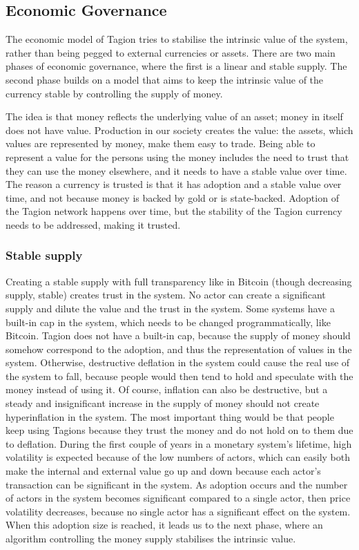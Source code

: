 \subsection{Economic Governance} \label{subsec:economic_governance}
The economic model of Tagion tries to stabilise the intrinsic value of the system, rather than being pegged to external currencies or assets. 
There are two main phases of economic governance, where the first is a linear and stable supply. The second phase builds on a model that aims to keep the intrinsic value of the currency stable by controlling the supply of money. 

The idea is that money reflects the underlying value of an asset; money in itself does not have value. Production in our society creates the value: the assets, which values are represented by money, make them easy to trade. Being able to represent a value for the persons using the money includes the need to trust that they can use the money elsewhere, and it needs to have a stable value over time. 
The reason a currency is trusted is that it has adoption and a stable value over time, and not because money is backed by gold or is state-backed. Adoption of the Tagion network happens over time, but the stability of the Tagion currency needs to be addressed, making it trusted. 


\subsubsection{Stable supply}
Creating a stable supply with full transparency like in Bitcoin (though decreasing supply, stable) creates trust in the system. No actor can create a significant supply and dilute the value and the trust in the system. 
Some systems have a built-in cap in the system, which needs to be changed programmatically, like Bitcoin. Tagion does not have a built-in cap, because the supply of money should somehow correspond to the adoption, and thus the representation of values in the system. Otherwise, destructive deflation in the system could cause the real use of the system to fall, because people would then tend to hold and speculate with the money instead of using it. Of course, inflation can also be destructive, but a steady and insignificant increase in the supply of money should not create hyperinflation in the system. The most important thing would be that people keep using Tagions because they trust the money and do not hold on to them due to deflation.
During the first couple of years in a monetary system's lifetime, high volatility is expected because of the low numbers of actors, which can easily both make the internal and external value go up and down because each actor's transaction can be significant in the system. As adoption occurs and the number of actors in the system becomes significant compared to a single actor, then price volatility decreases, because no single actor has a significant effect on the system. When this adoption size is reached, it leads us to the next phase, where an algorithm controlling the money supply stabilises the intrinsic value. 

